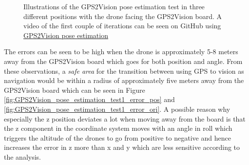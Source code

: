 \documentclass[../Head/report.tex]{subfiles}
\begin{document}
\begin{figure}[H]
\begin{subfigure}[t]{.30\textwidth}
        \caption{}
        \label{fig:GPS2Vision_pose_estimation_three}
    \end{subfigure}
    \caption{Illustrations of the GPS2Vision pose estimation test in three different positions with the drone facing the GPS2Vision board. A video of the first couple of iterations can be seen on GitHub using \href{https://github.com/Kenil16/master_project/tree/master/test_videos/analyse_GPS2Vision_aruco_pose_estimation}{GPS2Vision pose estimation}
 }
    \label{fig:GPS2Vision_pose_estimation}
\end{figure}

The errors can be seen to be high when the drone is approximately 5-8 meters away from the GPS2Vision board which goes for both position and angle. From these observations, a \textit{safe area} for the transition between using GPS to vision as navigation would be within a radius of approximately five meters away from the GPS2Vision board which can be seen in Figure \ref{fig:GPS2Vision_pose_estimation_test1_error_pos} and \ref{fig:GPS2Vision_pose_estimation_test1_error_ori}. A possible reason why especially the z position deviates a lot when moving away from the board is that the z component in the coordinate system moves with an angle in roll which triggers the altitude of the drones to go from positive to negative and hence increases the error in z more than x and y which are less sensitive according to the analysis. 
\end{document}
